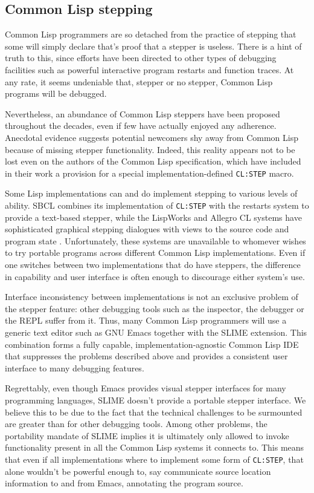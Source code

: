 \documentclass[sigconf]{acmart}
\begin{document}
\subsection{Common Lisp stepping}


Common Lisp programmers are so detached from the practice of stepping
that some will simply declare that's proof that a stepper is useless.
There is a hint of truth to this, since efforts have been directed to
other types of debugging facilities such as powerful interactive
program restarts and function traces.  At any rate, it seems
undeniable that, stepper or no stepper, Common Lisp programs will be
debugged.

Nevertheless, an abundance of Common Lisp steppers have been proposed
throughout the decades, even if few have actually enjoyed any
adherence.  Anecdotal evidence suggests potential newcomers shy away
from Common Lisp because of missing stepper functionality.  Indeed,
this reality appears not to be lost even on the authors of the Common
Lisp specification, which have included in their work a provision for
a special implementation-defined \texttt{CL:STEP} macro.

Some Lisp implementations can and do implement stepping to various
levels of ability.  SBCL combines its implementation of
\texttt{CL:STEP} with the restarts system to provide a text-based
stepper, while the LispWorks\cite{lispworks-stepper} and Allegro CL
systems have sophisticated graphical stepping dialogues with views to
the source code and program state .  Unfortunately, these systems are
unavailable to whomever wishes to try portable programs across
different Common Lisp implementations.  Even if one switches between
two implementations that do have steppers, the difference in
capability and user interface is often enough to discourage either
system's use.

Interface inconsistency between implementations is not an exclusive
problem of the stepper feature: other debugging tools such as the
inspector, the debugger or the REPL suffer from it.  Thus, many Common
Lisp programmers will use a generic text editor such as GNU
Emacs\cite{emacs} together with the SLIME\cite{slime} extension.  This
combination forms a fully capable, implementation-agnostic Common Lisp
IDE that suppresses the problems described above and provides a
consistent user interface to many debugging features.

Regrettably, even though Emacs provides visual stepper interfaces for
many programming languages, SLIME doesn't provide a portable stepper
interface.  We believe this to be due to the fact that the technical
challenges to be surmounted are greater than for other debugging
tools.  Among other problems, the portability mandate of SLIME implies
it is ultimately only allowed to invoke functionality present in all
the Common Lisp systems it connects to.  This means that even if all
implementations where to implement some form of \texttt{CL:STEP}, that
alone wouldn't be powerful enough to, say communicate source location
information to and from Emacs, annotating the program source.
\end{document}
